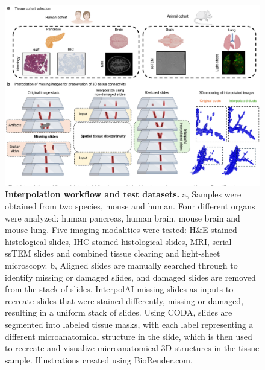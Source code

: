 \begin{refsection}
    \begin{figure}[!htb] 
        \begin{center}
            \includegraphics[width=1\textwidth,height=0.85\textheight,keepaspectratio,clip,page=1]{figures/chapter6/fig_1.png}
            \captionsetup{font=small}
            \caption{\textbf{Interpolation workflow and test datasets.} a, Samples were obtained from two species, mouse and human. Four different organs were analyzed: human pancreas, human brain, mouse brain and mouse lung. Five imaging modalities were tested: H\&E-stained histological slides, IHC stained histological slides, MRI, serial ssTEM slides and combined tissue clearing and light-sheet microscopy. b, Aligned slides are manually searched through to identify missing or damaged slides, and damaged slides are removed from the stack of slides. InterpolAI missing slides as inputs to recreate slides that were stained differently, missing or damaged, resulting in a uniform stack of slides. Using CODA, slides are segmented into labeled tissue masks, with each label representing a different microanatomical structure in the slide, which is then used to recreate and visualize microanatomical 3D structures in the tissue sample. Illustrations created using BioRender.com.}
            \label{chapter6_fig1}
        \end{center}
    \end{figure}
    
    

\end{refsection}
